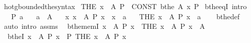 \begin{isabellebody}
\isamarkupfalse%
\isanewline
{}\isamarkupfalse%
\ hotg{\isacharunderscore}{\kern0pt}bounded{\isacharunderscore}{\kern0pt}the{\isacharunderscore}{\kern0pt}syntax\isanewline
\isanewline
{}\isamarkupfalse%
\ {\isachardoublequoteopen}THE\ x\ {\isasymin}\ A{\isachardot}{\kern0pt}\ P{\isachardoublequoteclose}\ {\isasymrightleftharpoons}\ {\isachardoublequoteopen}CONST\ bthe\ A\ {\isacharparenleft}{\kern0pt}{\isasymlambda}x{\isachardot}{\kern0pt}\ P{\isacharparenright}{\kern0pt}{\isachardoublequoteclose}\isanewline
\isanewline
{}\isamarkupfalse%
\ bthe{\isacharunderscore}{\kern0pt}eqI\ {\isacharbrackleft}{\kern0pt}intro{\isacharbrackright}{\kern0pt}{\isacharcolon}{\kern0pt}\isanewline
\ \ \ {\isachardoublequoteopen}P\ a{\isachardoublequoteclose}\isanewline
\ \ \ {\isachardoublequoteopen}a\ {\isasymin}\ A{\isachardoublequoteclose}\isanewline
\ \ \ {\isachardoublequoteopen}{\isasymAnd}x{\isachardot}{\kern0pt}\ {\isasymlbrakk}x\ {\isasymin}\ A{\isacharsemicolon}{\kern0pt}\ P\ x{\isasymrbrakk}\ {\isasymLongrightarrow}\ x\ {\isacharequal}{\kern0pt}\ a{\isachardoublequoteclose}\isanewline
\ \ \ {\isachardoublequoteopen}{\isacharparenleft}{\kern0pt}THE\ x\ {\isasymin}\ A{\isachardot}{\kern0pt}\ P\ x{\isacharparenright}{\kern0pt}\ {\isacharequal}{\kern0pt}\ a{\isachardoublequoteclose}\isanewline
%
\isadelimproof
\ \ %
\endisadelimproof
%
\isatagproof
{}\isamarkupfalse%
\ bthe{\isacharunderscore}{\kern0pt}def\ \isamarkupfalse%
\ {\isacharparenleft}{\kern0pt}auto\ intro{\isacharcolon}{\kern0pt}\ assms{\isacharparenright}{\kern0pt}%
\endisatagproof
{\isafoldproof}%
%
\isadelimproof
\isanewline
%
\endisadelimproof
\isanewline
{}\isamarkupfalse%
\isanewline
\ \ bthe{\isacharunderscore}{\kern0pt}memI{\isacharcolon}{\kern0pt}\ {\isachardoublequoteopen}{\isasymexists}{\isacharbang}{\kern0pt}x\ {\isasymin}\ A{\isachardot}{\kern0pt}\ P\ x\ {\isasymLongrightarrow}\ {\isacharparenleft}{\kern0pt}THE\ x\ {\isasymin}\ A{\isachardot}{\kern0pt}\ P\ x{\isacharparenright}{\kern0pt}\ {\isasymin}\ A{\isachardoublequoteclose}\ \isanewline
\ \ btheI{\isacharcolon}{\kern0pt}\ {\isachardoublequoteopen}{\isasymexists}{\isacharbang}{\kern0pt}x\ {\isasymin}\ A{\isachardot}{\kern0pt}\ P\ x\ {\isasymLongrightarrow}\ P\ {\isacharparenleft}{\kern0pt}THE\ x\ {\isasymin}\ A{\isachardot}{\kern0pt}\ P\ x{\isacharparenright}{\kern0pt}{\isachardoublequoteclose}\isanewline
%
\isadelimproof
\ \ %
\endisadelimproof

\end{isabellebody}
